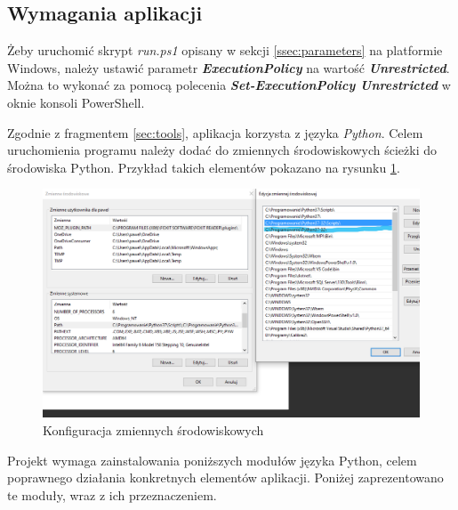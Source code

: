 \subsection{Wymagania aplikacji}
\label{ssec:apprequirements}
Żeby uruchomić skrypt \emph{run.ps1} opisany w sekcji \ref{ssec:parameters} na platformie Windows, należy ustawić parametr \emph{\textbf{ExecutionPolicy}} na wartość \emph{\textbf{Unrestricted}}. Można to wykonać za pomocą polecenia \emph{\textbf{Set-ExecutionPolicy Unrestricted}} w oknie konsoli PowerShell.\par
Zgodnie z fragmentem \ref{sec:tools}, aplikacja korzysta z języka \emph{Python}. Celem uruchomienia programu należy dodać do zmiennych środowiskowych ścieżki do środowiska Python. Przykład takich elementów pokazano na rysunku \ref{fig:path}.
\begin{figure}[H]
        \centering
        \captionsetup{justification=centering,margin=2cm}
        \includegraphics[width=\linewidth]{resources/path.png}
        \caption{Konfiguracja zmiennych środowiskowych}
        \label{fig:path}
\end{figure}
Projekt wymaga zainstalowania poniższych modułów języka Python, celem poprawnego działania konkretnych elementów aplikacji. Poniżej zaprezentowano te moduły, wraz z ich przeznaczeniem.\par
